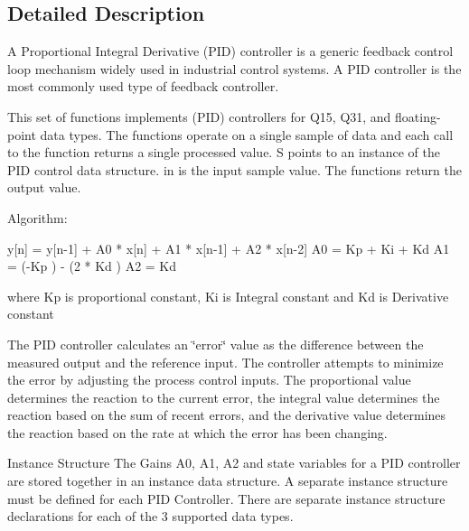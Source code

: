 \subsection{Detailed Description}
A Proportional Integral Derivative (P\+ID) controller is a generic feedback control loop mechanism widely used in industrial control systems. A P\+ID controller is the most commonly used type of feedback controller.

This set of functions implements (P\+ID) controllers for Q15, Q31, and floating-\/point data types. The functions operate on a single sample of data and each call to the function returns a single processed value. {\ttfamily S} points to an instance of the P\+ID control data structure. {\ttfamily in} is the input sample value. The functions return the output value.

\begin{DoxyParagraph}{Algorithm\+:}

\begin{DoxyPre}
   y[n] = y[n-1] + A0 * x[n] + A1 * x[n-1] + A2 * x[n-2]
   A0 = Kp + Ki + Kd
   A1 = (-Kp ) - (2 * Kd )
   A2 = Kd  \end{DoxyPre}

\end{DoxyParagraph}
\begin{DoxyParagraph}{}
where {\ttfamily Kp} is proportional constant, {\ttfamily Ki} is Integral constant and {\ttfamily Kd} is Derivative constant
\end{DoxyParagraph}
\begin{DoxyParagraph}{}
 
\end{DoxyParagraph}
\begin{DoxyParagraph}{}
The P\+ID controller calculates an \char`\"{}error\char`\"{} value as the difference between the measured output and the reference input. The controller attempts to minimize the error by adjusting the process control inputs. The proportional value determines the reaction to the current error, the integral value determines the reaction based on the sum of recent errors, and the derivative value determines the reaction based on the rate at which the error has been changing.
\end{DoxyParagraph}
\begin{DoxyParagraph}{Instance Structure}
The Gains A0, A1, A2 and state variables for a P\+ID controller are stored together in an instance data structure. A separate instance structure must be defined for each P\+ID Controller. There are separate instance structure declarations for each of the 3 supported data types.
\end{DoxyParagraph}
